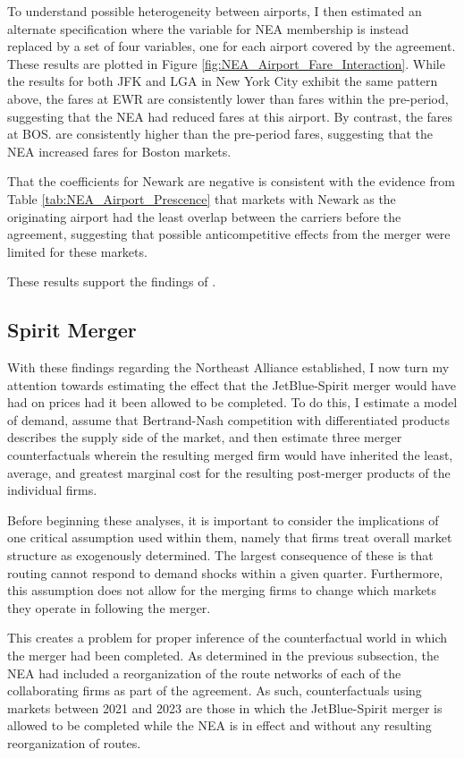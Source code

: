 \documentclass{article}
\let\Oldsubsection\subsection
\renewcommand{\subsection}{\FloatBarrier\Oldsubsection}
\begin{document}
	To understand possible heterogeneity between airports, I then estimated an alternate specification where the variable for NEA membership is instead replaced by a set of four variables, one for each airport covered by the agreement. These results are plotted in Figure \ref{fig:NEA_Airport_Fare_Interaction}. While the results for both JFK and LGA in New York City exhibit the same pattern above, the fares at EWR are consistently lower than fares within the pre-period, suggesting that the NEA had reduced fares at this airport. By contrast, the fares at BOS. are consistently higher than the pre-period fares, suggesting that the NEA increased fares for Boston markets.
	
	 That the coefficients for Newark are negative is consistent with the evidence from Table \ref{tab:NEA_Airport_Prescence} that markets with Newark as the originating airport had the least overlap between the carriers before the agreement, suggesting that possible anticompetitive effects from the merger were limited for these markets. 
	
		These results support the findings of \citet{zou_assessing_2023}. 
	

	
	\subsection{Spirit Merger}
	With these findings regarding the Northeast Alliance established, I now turn my attention towards estimating the effect that the JetBlue-Spirit merger would have had on prices had it been allowed to be completed. To do this, I estimate a model of demand, assume that Bertrand-Nash competition with differentiated products describes the supply side of the market, and then estimate three merger counterfactuals wherein the resulting merged firm would have inherited the least, average, and greatest marginal cost for the resulting post-merger products of the individual firms. 
	
	Before beginning these analyses, it is important to consider the implications of one critical assumption used within them, namely that firms treat overall market structure as exogenously determined. The largest consequence of these is that routing cannot respond to demand shocks within a given quarter. Furthermore, this assumption does not allow for the merging firms to change which markets they operate in following the merger.
	
	This creates a problem for proper inference of the counterfactual world in which the merger had been completed. As determined in the previous subsection, the NEA had included a reorganization of the route networks of each of the collaborating firms as part of the agreement. As such, counterfactuals using markets between 2021 and 2023 are those in which the JetBlue-Spirit merger is allowed to be completed while the NEA is in effect and without any resulting reorganization of routes. 
	
\end{document}

